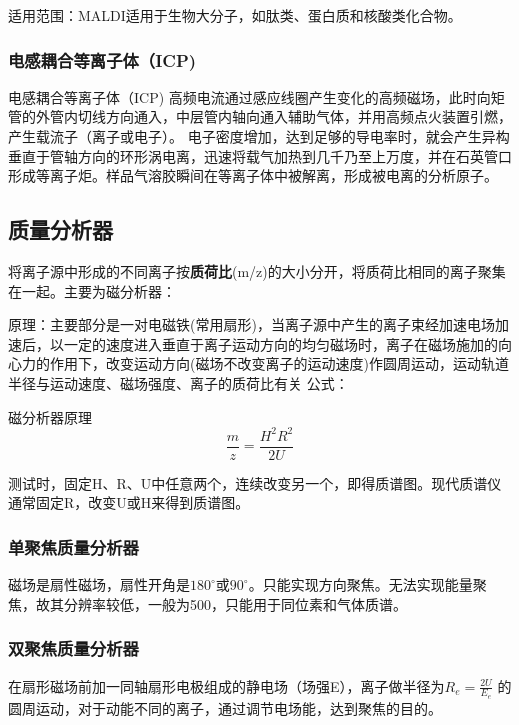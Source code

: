     适用范围：MALDI适用于生物大分子，如肽类、蛋白质和核酸类化合物。

\subsubsection*{电感耦合等离子体（ICP)}
    \begin{definition*}{电感耦合等离子体（ICP)}
        高频电流通过感应线圈产生变化的高频磁场，此时向矩管的外管内切线方向通入，中层管内轴向通入辅助气体，并用高频点火装置引燃，产生载流子（离子或电子）。 电子密度增加，达到足够的导电率时，就会产生异构垂直于管轴方向的环形涡电离，迅速将载气加热到几千乃至上万度，并在石英管口形成等离子炬。样品气溶胶瞬间在等离子体中被解离，形成被电离的分析原子。
    \end{definition*}


\subsection{质量分析器}
将离子源中形成的不同离子按\textbf{质荷比}(m/z)的大小分开，将质荷比相同的离子聚集在一起。主要为磁分析器：

原理：主要部分是一对电磁铁(常用扇形)，当离子源中产生的离子束经加速电场加速后，以一定的速度进入垂直于离子运动方向的均匀磁场时，离子在磁场施加的向
心力的作用下，改变运动方向(磁场不改变离子的运动速度)作圆周运动，运动轨道半径与运动速度、磁场强度、离子的质荷比有关
公式：
\begin{theorem*}{磁分析器原理}
    \begin{equation*}
        \frac{m}{z}=\frac{H^{2}R^{2}}{2U}
    \end{equation*}
\end{theorem*}

测试时，固定H、R、U中任意两个，连续改变另一个，即得质谱图。现代质谱仪通常固定R，改变U或H来得到质谱图。
\subsubsection*{单聚焦质量分析器}
磁场是扇性磁场，扇性开角是$180^{\circ}$或$90^{\circ}$。只能实现方向聚焦。无法实现能量聚焦，故其分辨率较低，一般为500，只能用于同位素和气体质谱。
\subsubsection*{双聚焦质量分析器}
在扇形磁场前加一同轴扇形电极组成的静电场（场强E），离子做半径为$R_{e}=\frac{2U}{E_{e}}$
的圆周运动，对于动能不同的离子，通过调节电场能，达到聚焦的目的。

